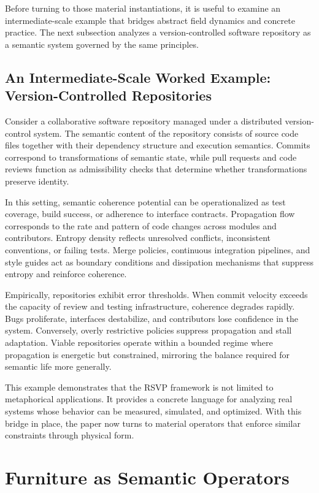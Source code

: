 \documentclass[11pt,oneside]{article}
\begin{document}
Before turning to those material instantiations, it is useful to examine an intermediate-scale example that bridges abstract field dynamics and concrete practice. The next subsection analyzes a version-controlled software repository as a semantic system governed by the same principles.

\subsection{An Intermediate-Scale Worked Example: Version-Controlled Repositories} 

Consider a collaborative software repository managed under a distributed version-control system. The semantic content of the repository consists of source code files together with their dependency structure and execution semantics. Commits correspond to transformations of semantic state, while pull requests and code reviews function as admissibility checks that determine whether transformations preserve identity.

In this setting, semantic coherence potential can be operationalized as test coverage, build success, or adherence to interface contracts. Propagation flow corresponds to the rate and pattern of code changes across modules and contributors. Entropy density reflects unresolved conflicts, inconsistent conventions, or failing tests. Merge policies, continuous integration pipelines, and style guides act as boundary conditions and dissipation mechanisms that suppress entropy and reinforce coherence.

Empirically, repositories exhibit error thresholds. When commit velocity exceeds the capacity of review and testing infrastructure, coherence degrades rapidly. Bugs proliferate, interfaces destabilize, and contributors lose confidence in the system. Conversely, overly restrictive policies suppress propagation and stall adaptation. Viable repositories operate within a bounded regime where propagation is energetic but constrained, mirroring the balance required for semantic life more generally.

This example demonstrates that the RSVP framework is not limited to metaphorical applications. It provides a concrete language for analyzing real systems whose behavior can be measured, simulated, and optimized. With this bridge in place, the paper now turns to material operators that enforce similar constraints through physical form.



\section{Furniture as Semantic Operators} 
\end{document}

